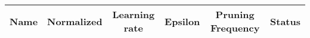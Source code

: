 \documentclass[11pt,fleqn]{book} %
\begin{document}
																																																																																																																																																																																																																																																																																			    \begin{table}[h!]
																																																																																																																																																																																																																																																																																			      \centering
																																																																																																																																																																																																																																																																																			          \begin{tabular}{ c c c c c c }
																																																																																																																																																																																																																																																																																				      \hline\hline
																																																																																																																																																																																																																																																																																				          
																																																																																																																																																																																																																																																																																					      Name & Normalized & Learning rate & Epsilon & Pruning Frequency & Status\\
																																																																																																																																																																																																																																																																																					          \hline
																																																																																																																																																																																																																																																																																						      

\end{tabular}
\end{table}
\end{document}
